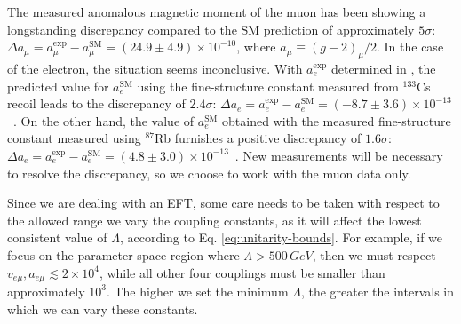 \documentclass[prd,amsfonts,onecolumn,superscriptaddress,aps,nofootinbib,11pt]{revtex4-1}
\begin{document}
The measured anomalous magnetic moment of the muon has been showing a longstanding discrepancy compared to the SM prediction of approximately $5\sigma$: $\Delta a_\mu = a_\mu^{\mathrm{exp}}-a_\mu^{\mathrm{SM}}=(24.9 \pm 4.9)\times 10^{-10}$, where $a_\mu\equiv (g-2)_\mu/2$. In the case of the electron, the situation seems inconclusive. With $a_e^{\mathrm{exp}}$ determined in \cite{Hanneke_2008,Hanneke:2010au}, the predicted value for $a_e^{\mathrm{SM}}$ 
using the fine-structure constant measured from $^{133}$Cs recoil leads to the discrepancy of $2.4\sigma$: $\Delta a_e = a_e^{\mathrm{exp}}-a_e^{\mathrm{SM}}=(-8.7\pm 3.6)\times 10^{-13}$~\cite{Parker:2018vye}. On the other hand, the value of $a_e^{\mathrm{SM}}$ obtained with the measured fine-structure constant measured using $^{87}$Rb furnishes a positive discrepancy of $1.6\sigma$: $\Delta a_e = a_e^{\mathrm{exp}}-a_e^{\mathrm{SM}}=(4.8\pm 3.0)\times 10^{-13}$~\cite{Morel:2020dww}. 
New measurements will be necessary to resolve the discrepancy, so we choose to work with the muon data only.



Since we are dealing with an EFT, some care needs to be taken with respect to the allowed range we vary the coupling constants, as it will affect the lowest consistent value of $\Lambda$, according to Eq. \eqref{eq:unitarity-bounds}. For example, if we focus on the parameter space region where $\Lambda > 500 \, \si{GeV}$, then we must respect $v_{e \mu}, a_{e \mu} \lesssim 2\times 10^4$, while all other four couplings must be smaller than approximately $10^3$. The higher we set the minimum $\Lambda$, the greater the intervals in which we can vary these constants. 
\end{document}
